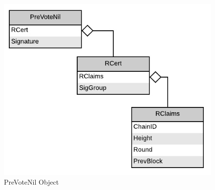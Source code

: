 \begin{figure}[H]
    \centering
    \includegraphics[scale=0.5]{figures/PreVoteNil_Object.pdf}
    \caption{PreVoteNil Object}
\end{figure}

